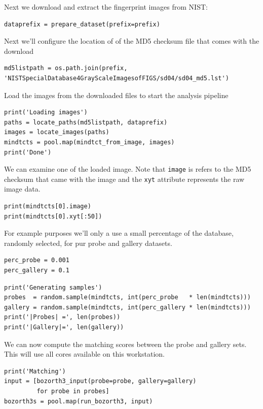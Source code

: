Next we download and extract the fingerprint images from NIST:

\begin{lstlisting}
dataprefix = prepare_dataset(prefix=prefix)
\end{lstlisting}

Next we'll configure the location of of the MD5 checksum file that comes
with the download

\begin{lstlisting}
md5listpath = os.path.join(prefix, 'NISTSpecialDatabase4GrayScaleImagesofFIGS/sd04/sd04_md5.lst')
\end{lstlisting}

Load the images from the downloaded files to start the analysis pipeline

\begin{lstlisting}
print('Loading images')
paths = locate_paths(md5listpath, dataprefix)
images = locate_images(paths)
mindtcts = pool.map(mindtct_from_image, images)
print('Done')
\end{lstlisting}

We can examine one of the loaded image. Note that \texttt{image} is
refers to the MD5 checksum that came with the image and the \texttt{xyt}
attribute represents the raw image data.

\begin{lstlisting}
print(mindtcts[0].image)
print(mindtcts[0].xyt[:50])
\end{lstlisting}

For example purposes we'll only a use a small percentage of the
database, randomly selected, for pur probe and gallery datasets.

\begin{lstlisting}
perc_probe = 0.001
perc_gallery = 0.1
\end{lstlisting}

\begin{lstlisting}
print('Generating samples')
probes  = random.sample(mindtcts, int(perc_probe   * len(mindtcts)))
gallery = random.sample(mindtcts, int(perc_gallery * len(mindtcts)))
print('|Probes| =', len(probes))
print('|Gallery|=', len(gallery))
\end{lstlisting}

We can now compute the matching scores between the probe and gallery
sets. This will use all cores available on this workstation.

\begin{lstlisting}
print('Matching')
input = [bozorth3_input(probe=probe, gallery=gallery)
         for probe in probes]
bozorth3s = pool.map(run_bozorth3, input)
\end{lstlisting}

